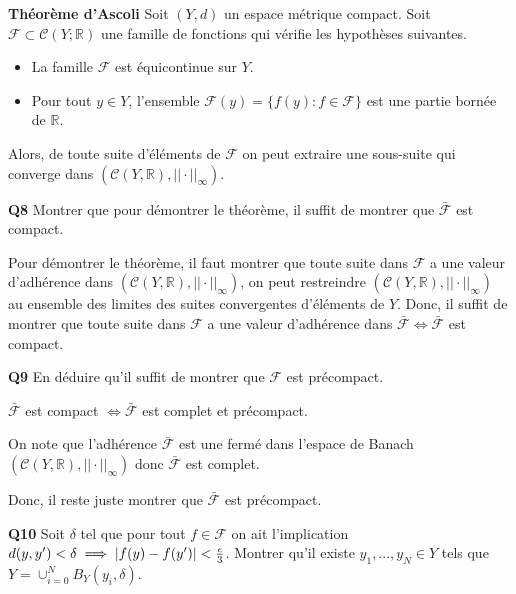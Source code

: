 \documentclass[french]{article}
\begin{document}
	\begin{tcolorbox}[colback=yellow!5!white,colframe=yellow!75!black]
		\textbf{\large{Théorème d'Ascoli}} Soit $(Y,d)$ un espace métrique compact. Soit $\mathcal{F} \subset \mathcal{C}(Y; \mathbb{R})$ une famille de fonctions qui vérifie les hypothèses suivantes.
		\begin{itemize}
			\item La famille $\mathcal{F}$ est équicontinue sur $Y$.
			\item Pour tout $y \in Y$, l'ensemble $\mathcal{F}(y) = \{f(y) : f \in \mathcal{F}\}$ est une partie bornée de $\mathbb{R}$.
		\end{itemize}
		Alors, de toute suite d'éléments de $\mathcal{F}$ on peut extraire une sous-suite qui converge dans $(\mathcal{C}(Y, \mathbb{R}), ||\cdot||_{\infty})$.
	\end{tcolorbox}
	
	\begin{tcolorbox}[colback=gray!5!white,colframe=gray!75!black]
		\textbf{\large{Q8}} Montrer que pour démontrer le théorème, il suffit de montrer que $\bar{\mathcal{F}}$ est compact.
	\end{tcolorbox}

	Pour démontrer le théorème, il faut montrer que toute suite dans $\mathcal{F}$ a une valeur d'adhérence dans $(\mathcal{C}(Y, \mathbb{R}), ||\cdot||_{\infty})$, on peut restreindre $(\mathcal{C}(Y, \mathbb{R}), ||\cdot||_{\infty})$ au ensemble des limites des suites convergentes d'éléments de $Y$. Donc, il suffit de montrer que toute suite dans $\mathcal{F}$ a une valeur d'adhérence dans $\bar{\mathcal{F}} \iff \bar{\mathcal{F}}$ est compact.

	\begin{tcolorbox}[colback=gray!5!white,colframe=gray!75!black]
		\textbf{\large{Q9}} En déduire qu'il suffit de montrer que $\mathcal{F}$ est précompact.
	\end{tcolorbox}

	$\bar{\mathcal{F}}$ est compact $\iff \bar{\mathcal{F}}$ est complet et précompact.
	
	On note que l'adhérence $\bar{\mathcal{F}}$ est une fermé dans l'espace de Banach $(\mathcal{C}(Y,\mathbb{R}), ||\cdot||_{\infty})$ donc $\bar{\mathcal{F}}$ est complet.
	
	Donc, il reste juste montrer que $\bar{\mathcal{F}}$ est précompact.

	\begin{tcolorbox}[colback=gray!5!white,colframe=gray!75!black]
		\textbf{\large{Q10}} Soit $\delta$ tel que pour tout $f \in \mathcal{F}$ on ait l'implication $d(y, y\sp{\prime}) < \delta \implies |f(y) - f(y\sp{\prime})| < \frac{\epsilon}{3}$. Montrer qu'il existe $y_1,...,y_N \in Y$ tels que $Y=\cup_{i=0}^{N}B_Y(y_i, \delta)$.
	\end{tcolorbox}
\end{document}
